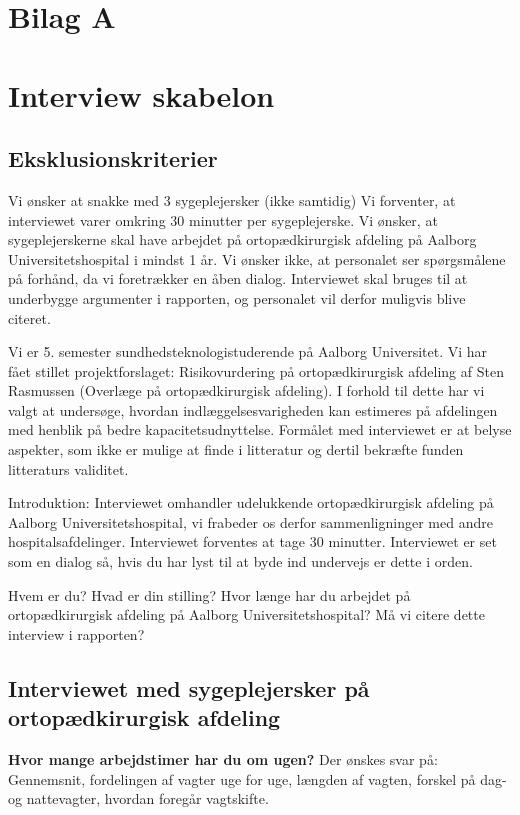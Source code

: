 \section{Bilag A}

\section{Interview skabelon}

\subsection{Eksklusionskriterier}
Vi ønsker at snakke med 3 sygeplejersker (ikke samtidig)
Vi forventer, at interviewet varer omkring 30 minutter per sygeplejerske.
Vi ønsker, at sygeplejerskerne skal have arbejdet på ortopædkirurgisk afdeling på Aalborg Universitetshospital i mindst 1 år.
Vi ønsker ikke, at personalet ser spørgsmålene på forhånd, da vi foretrækker en åben dialog.
Interviewet skal bruges til at underbygge argumenter i rapporten, og personalet vil derfor muligvis blive citeret.


Vi er 5. semester sundhedsteknologistuderende på Aalborg Universitet. Vi har fået stillet projektforslaget: Risikovurdering på ortopædkirurgisk afdeling af Sten Rasmussen (Overlæge på ortopædkirurgisk afdeling). I forhold til dette har vi valgt at undersøge, hvordan indlæggelsesvarigheden kan estimeres på afdelingen med henblik på bedre kapacitetsudnyttelse. Formålet med interviewet er at belyse aspekter, som ikke er mulige at finde i litteratur og dertil bekræfte funden litteraturs validitet.  


Introduktion:
Interviewet omhandler udelukkende ortopædkirurgisk afdeling på Aalborg Universitetshospital, vi frabeder os derfor sammenligninger med andre hospitalsafdelinger. Interviewet forventes at tage 30 minutter. Interviewet er set som en dialog så, hvis du har lyst til at byde ind undervejs er dette i orden.


Hvem er du?
Hvad er din stilling?
Hvor længe har du arbejdet på ortopædkirurgisk afdeling på Aalborg Universitetshospital?
Må vi citere dette interview i rapporten?

\subsection{Interviewet med sygeplejersker på ortopædkirurgisk afdeling}
\textbf{Hvor mange arbejdstimer har du om ugen?}
Der ønskes svar på: Gennemsnit, fordelingen af vagter uge for uge, længden af vagten, forskel på dag- og nattevagter, hvordan foregår vagtskifte. 

